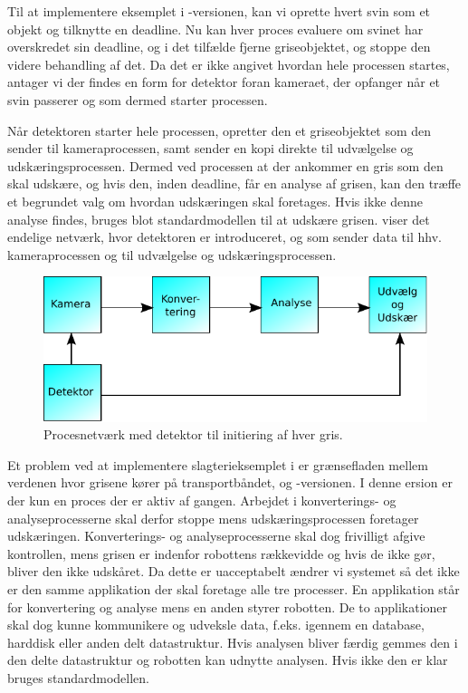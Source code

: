 Til at implementere eksemplet i -versionen, kan vi oprette hvert svin som et objekt og tilknytte en deadline. Nu kan hver proces evaluere om svinet har overskredet sin deadline, og i det tilfælde fjerne griseobjektet, og stoppe den videre behandling af det. Da det er ikke angivet hvordan hele processen startes,  antager vi der findes en form for detektor foran kameraet, der opfanger når et svin passerer og som dermed starter processen. 

Når detektoren starter hele processen, opretter den et griseobjektet som den sender til kameraprocessen, samt sender en kopi direkte til udvælgelse og udskæringsprocessen. Dermed ved processen at der ankommer en gris som den skal udskære, og hvis den, inden deadline, får en analyse af grisen, kan den træffe et begrundet valg om hvordan udskæringen skal foretages. Hvis ikke denne analyse findes, bruges blot standardmodellen til at udskære grisen.  viser det endelige  netværk, hvor detektoren er introduceret, og som sender data til hhv. kameraprocessen og til udvælgelse og udskæringsprocessen. 

\begin{figure}
 \begin{center}
  \includegraphics[scale=1]{images/pig-network2}
	\caption{Procesnetværk med detektor til initiering af hver gris.}
	\label{fig:pig-network2}
\end{center}
\end{figure}

Et problem ved at implementere slagterieksemplet i \pycsp er  grænsefladen mellem verdenen hvor grisene kører på transportbåndet, og  -versionen.  I denne ersion er der kun  en proces  der er aktiv af gangen. Arbejdet i  konverterings- og analyseprocesserne skal derfor stoppe  mens  udskæringsprocessen foretager udskæringen.  Konverterings- og analyseprocesserne  skal dog frivilligt afgive kontrollen, mens grisen er indenfor robottens rækkevidde og hvis de ikke gør, bliver den ikke udskåret. Da dette er uacceptabelt ændrer vi systemet så det ikke er den samme applikation der skal foretage alle tre processer. En applikation står for konvertering og analyse mens en anden  styrer robotten. De to applikationer skal dog kunne kommunikere og  udveksle data, f.eks. igennem en database, harddisk eller anden delt datastruktur. Hvis analysen bliver færdig gemmes den i den delte datastruktur og robotten kan udnytte analysen. Hvis ikke den er klar bruges standardmodellen.    

